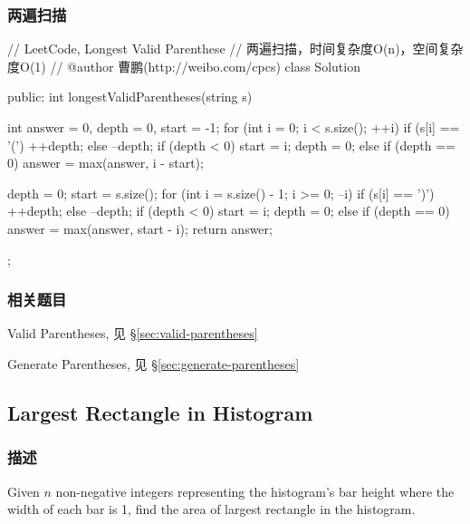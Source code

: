 \subsubsection{两遍扫描}
\begin{Code}
// LeetCode, Longest Valid Parenthese
// 两遍扫描，时间复杂度O(n)，空间复杂度O(1)
// @author 曹鹏(http://weibo.com/cpcs)
class Solution {
public:
    int longestValidParentheses(string s) {
        int answer = 0, depth = 0, start = -1;
        for (int i = 0; i < s.size(); ++i) {
            if (s[i] == '(') {
                ++depth;
            } else {
                --depth;
                if (depth < 0) {
                    start = i;
                    depth = 0;
                } else if (depth == 0) {
                    answer = max(answer, i - start);
                }
            } 
        }

        depth = 0;
        start = s.size();
        for (int i = s.size() - 1; i >= 0; --i) {
            if (s[i] == ')') {
                ++depth;
            } else {
                --depth;
                if (depth < 0) {
                    start = i;
                    depth = 0;
                } else if (depth == 0) {
                    answer = max(answer, start - i);
                }
            } 
        }
        return answer;
    }
};
\end{Code}


\subsubsection{相关题目}
\begindot
\item Valid Parentheses, 见 \S \ref{sec:valid-parentheses}
\item Generate Parentheses, 见 \S \ref{sec:generate-parentheses}
\myenddot


\subsection{Largest Rectangle in Histogram} %
\label{sec:largest-rectangle-in-histogram}


\subsubsection{描述}
Given $n$ non-negative integers representing the histogram's bar height where the width of each bar is 1, find the area of largest rectangle in the histogram.

